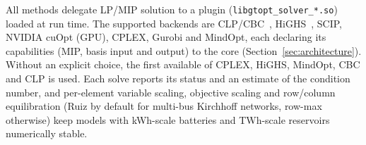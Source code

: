 All methods delegate LP/MIP solution to a plugin
(\texttt{libgtopt\_solver\_*.so}) loaded at run time.  The supported
backends are CLP/CBC~\cite{forrest2005cbc},
HiGHS~\cite{huangfu2018highs}, SCIP, NVIDIA cuOpt (GPU), CPLEX, Gurobi
and MindOpt, each declaring its capabilities (MIP, basis input and
output) to the core (Section~\ref{sec:architecture}).  Without an
explicit choice, the first available of CPLEX, HiGHS, MindOpt, CBC and
CLP is used.  Each solve reports its status and
an estimate of the condition number, and per-element variable scaling,
objective scaling and row/column equilibration (Ruiz by default for
multi-bus Kirchhoff networks, row-max otherwise) keep models with
kWh-scale batteries and TWh-scale reservoirs numerically stable.
